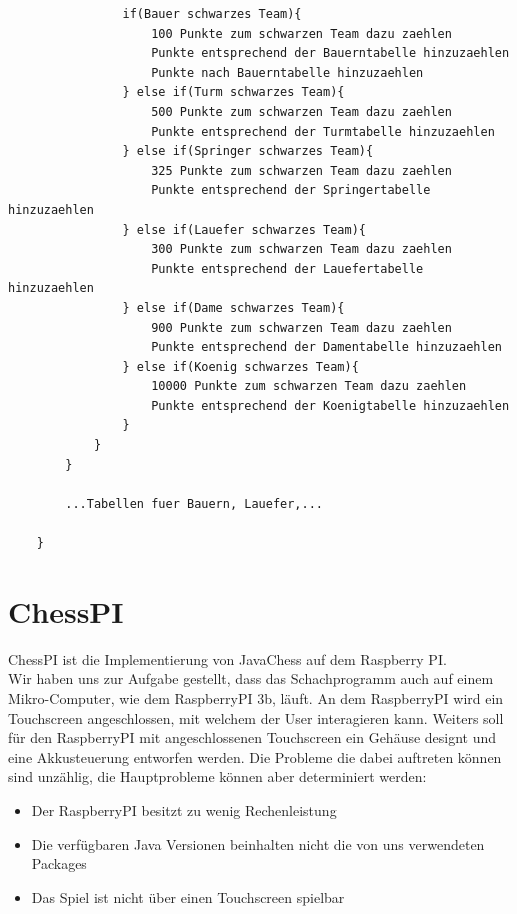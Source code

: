 \documentclass[12pt,a4paper]{article}
\begin{document}
{\begin{lstlisting}
				if(Bauer schwarzes Team){
					100 Punkte zum schwarzen Team dazu zaehlen
					Punkte entsprechend der Bauerntabelle hinzuzaehlen
					Punkte nach Bauerntabelle hinzuzaehlen
				} else if(Turm schwarzes Team){
					500 Punkte zum schwarzen Team dazu zaehlen
					Punkte entsprechend der Turmtabelle hinzuzaehlen
				} else if(Springer schwarzes Team){
					325 Punkte zum schwarzen Team dazu zaehlen
					Punkte entsprechend der Springertabelle hinzuzaehlen
				} else if(Lauefer schwarzes Team){
					300 Punkte zum schwarzen Team dazu zaehlen
					Punkte entsprechend der Lauefertabelle hinzuzaehlen
				} else if(Dame schwarzes Team){
					900 Punkte zum schwarzen Team dazu zaehlen
					Punkte entsprechend der Damentabelle hinzuzaehlen
				} else if(Koenig schwarzes Team){
					10000 Punkte zum schwarzen Team dazu zaehlen
					Punkte entsprechend der Koenigtabelle hinzuzaehlen
				}
			}
		}
		
		...Tabellen fuer Bauern, Lauefer,...		
		
	}	
\end{lstlisting}

\clearpage\vfill\newpage{}
\section{ChessPI}
\label{SEC:chesspi}

ChessPI ist die Implementierung von JavaChess auf dem Raspberry PI. \\
Wir haben uns zur Aufgabe gestellt, dass das Schachprogramm auch auf einem Mikro-Computer, wie dem RaspberryPI 3b, läuft. An dem RaspberryPI wird ein Touchscreen angeschlossen, mit welchem der User interagieren kann. Weiters soll für den RaspberryPI mit angeschlossenen Touchscreen ein Gehäuse designt und eine Akkusteuerung entworfen werden. 
Die Probleme die dabei auftreten können sind unzählig, die Hauptprobleme können aber determiniert werden:
\begin{itemize}
	\item{Der RaspberryPI besitzt zu wenig Rechenleistung}
	\item{Die verfügbaren Java Versionen beinhalten nicht die von uns verwendeten Packages}
	\item{Das Spiel ist nicht über einen Touchscreen spielbar}
\end{itemize}

}
\end{document}
